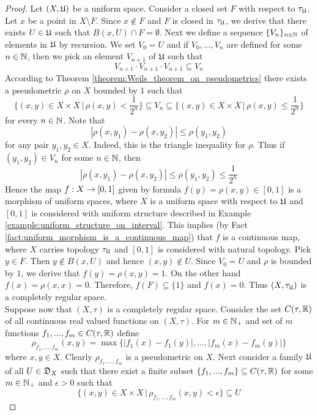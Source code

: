 \begin{proof}
Let $(X,{\mathfrak U})$ be a uniform space. Consider a closed set $F$ with respect to $\tau_{{\mathfrak U}}$. Let $x$ be a point in $X\setminus F$. Since $x \not \in F$ and $F$ is closed in $\tau_{{\mathfrak U}}$, we derive that there exists $U \in {\mathfrak U}$ such that $B(x,U)\cap F = \emptyset$. Next we define a sequence $\{V_n\}_{n\in {\mathbb N}}$ of elements in ${\mathfrak U}$ by recursion. We set $V_0 = U$ and if $V_0,...,V_n$ are defined for some $n\in {\mathbb N}$, then we pick an element $V_{n+1}$ of ${\mathfrak U}$ such that 
$$V_{n+1}\cdot V_{n+1}\cdot V_{n+1} \subseteq V_n$$
According to Theorem \ref{theorem:Weils_theorem_on_pseudometrics} there exists a pseudometric $\rho$ on $X$ bounded by $1$ such that
$$\bigg\{(x,y)\in X\times X\,\bigg|\,\rho(x,y)<\frac{1}{2^n}\bigg\} \subseteq V_n \subseteq \bigg\{(x,y)\in X\times X\,\bigg|\,\rho(x,y) \leq \frac{1}{2^n}\bigg\}$$
for every $n\in {\mathbb N}$. Note that
$$|\rho(x,y_1) - \rho(x,y_2)| \leq \rho(y_1,y_2)$$
for any pair $y_1,y_2\in X$. Indeed, this is the triangle inequality for $\rho$. Thus if $(y_1,y_2) \in V_n$ for some $n\in {\mathbb N}$, then
$$|\rho(x,y_1) - \rho(x,y_2)| \leq \rho(y_1,y_2) \leq \frac{1}{2^n}$$
Hence the map $f:X \rightarrow [0,1]$ given by formula $f(y) = \rho(x,y)\in [0,1]$ is a morphism of uniform spaces, where $X$ is a uniform space with respect to ${\mathfrak U}$ and $[0,1]$ is considered with uniform structure described in Example \ref{example:uniform_structure_on_interval}. This implies (by Fact \ref{fact:uniform_morphism_is_a_continuous_map}) that $f$ is a continuous map, where $X$ carries topology $\tau_{{\mathfrak U}}$ and $[0,1]$ is considered with natural topology. Pick $y\in F$. Then $y \not \in B(x,U)$ and hence $(x,y) \not \in U$. Since $V_0 = U$ and $\rho$ is bounded by $1$, we derive that $f(y) = \rho(x,y) = 1$. On the other hand $f(x) = \rho(x,x) = 0$. Therefore, $f(F) \subseteq \{1\}$ and $f(x) = 0$. Thus $(X,\tau_{{\mathfrak U}})$ is a completely regular space.\\
Suppose now that $(X,\tau)$ is a completely regular space. Consider the set $C(\tau,{\mathbb R})$ of all continuous real valued functions on $(X,\tau)$. For $m\in {\mathbb N}_+$ and set of $m$ functions $f_1,...,f_m\in C(\tau,{\mathbb R})$ define
$$\rho_{f_1,...,f_m}(x,y) = \max \big\{|f_1(x) - f_1(y)|,...,|f_m(x) - f_m(y)|\big\}$$
where $x,y\in X$. Clearly $\rho_{f_1,...,f_m}$ is a pseudometric on $X$. Next consider a family ${\mathfrak U}$ of all $U\in {\mathfrak D}_X$ such that there exist a finite subset $\{f_1,...,f_m\}\subseteq C(\tau,{\mathbb R})$ for some $m \in {\mathbb N}_+$ and $\epsilon > 0$ such that
$$\big\{(x,y)\in X\times X\,\big|\,\rho_{f_1,...,f_m}(x,y) < \epsilon\big\}\subseteq U$$

\end{proof}
